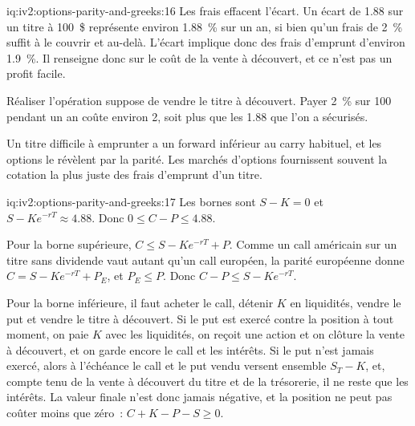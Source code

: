 \begin{solution}{iq:iv2:options-parity-and-greeks:16}
Les frais effacent l'écart. Un écart de 1.88 sur un titre à 100~\$ représente environ 1.88~\% sur un an, si bien qu'un frais de 2~\% suffit à le couvrir et au-delà. L'écart implique donc des frais d'emprunt d'environ 1.9~\%. Il renseigne donc sur le coût de la vente à découvert, et ce n'est pas un profit facile.

Réaliser l'opération suppose de vendre le titre à découvert. Payer 2~\% sur 100 pendant un an coûte environ 2, soit plus que les 1.88 que l'on a sécurisés.

Un titre difficile à emprunter a un forward inférieur au carry habituel, et les options le révèlent par la parité. Les marchés d'options fournissent souvent la cotation la plus juste des frais d'emprunt d'un titre.

\end{solution}

\begin{solution}{iq:iv2:options-parity-and-greeks:17}
Les bornes sont $S - K = 0$ et $S - Ke^{-rT} \approx 4.88$. Donc $0 \leq C - P \leq 4.88$.

Pour la borne supérieure, $C \leq S - Ke^{-rT} + P$. Comme un call américain sur un titre sans dividende vaut autant qu'un call européen, la parité européenne donne $C = S - Ke^{-rT} + P_E$, et $P_E \leq P$. Donc $C - P \leq S - Ke^{-rT}$.

Pour la borne inférieure, il faut acheter le call, détenir $K$ en liquidités, vendre le put et vendre le titre à découvert. Si le put est exercé contre la position à tout moment, on paie $K$ avec les liquidités, on reçoit une action et on clôture la vente à découvert, et on garde encore le call et les intérêts. Si le put n'est jamais exercé, alors à l'échéance le call et le put vendu versent ensemble $S_T - K$, et, compte tenu de la vente à découvert du titre et de la trésorerie, il ne reste que les intérêts. La valeur finale n'est donc jamais négative, et la position ne peut pas coûter moins que zéro~: $C + K - P - S \geq 0$.

\end{solution}

